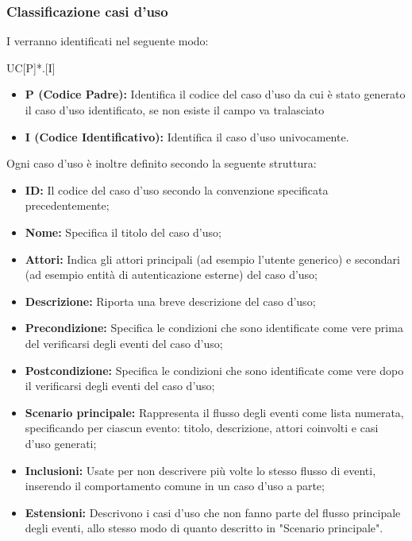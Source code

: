 \documentclass[../NomeDocumento.tex]{subfiles}
\begin{document}
	\subsubsection{Classificazione casi d’uso} 
	
	I  verranno identificati nel seguente modo: \centerline{UC[P]*.[I]}
	
	\begin{itemize}
		\item \textbf{P (Codice Padre):} Identifica il codice del caso d'uso da cui è stato generato il caso d'uso identificato, se non esiste il campo va tralasciato
		\item \textbf{I (Codice Identificativo):} Identifica il caso d'uso univocamente.
	\end{itemize}

	Ogni caso d'uso è inoltre definito secondo la seguente struttura:
	\begin{itemize}
		\item \textbf{ID:} Il codice del caso d'uso secondo la convenzione specificata precedentemente;
		\item \textbf{Nome:} Specifica il titolo del caso d'uso;
		\item \textbf{Attori:} Indica gli attori principali (ad esempio l'utente generico) e secondari (ad esempio entità di autenticazione esterne) del caso d'uso;
		\item \textbf{Descrizione:} Riporta una breve descrizione del caso d'uso;
		\item \textbf{Precondizione:} Specifica le condizioni che sono identificate come vere prima del verificarsi degli eventi del caso d'uso;
		\item \textbf{Postcondizione:} Specifica le condizioni che sono identificate come vere dopo il verificarsi degli eventi del caso d'uso;
		
		\item \textbf{Scenario principale:} Rappresenta il flusso degli eventi come lista numerata, specificando per ciascun evento: titolo, descrizione, attori coinvolti e casi d'uso generati;
		\item \textbf{Inclusioni:} Usate per non descrivere più volte lo stesso flusso di eventi, inserendo il comportamento comune in un caso d'uso a parte;
		\item \textbf{Estensioni:} Descrivono i casi d'uso che non fanno parte del flusso principale degli eventi, allo stesso modo di quanto descritto in "Scenario principale".
	\end{itemize}
\end{document}

